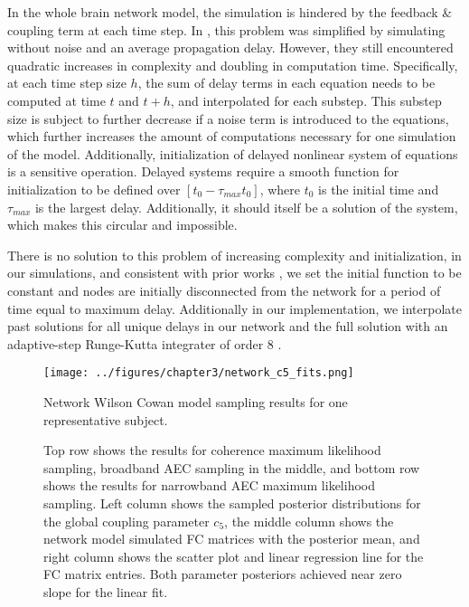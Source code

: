 In the whole brain network model, the simulation is hindered by the feedback \& coupling term at each time step. In \cite{hadida_bayesian_2018}, this problem was simplified by simulating without noise and an average propagation delay. However, they still encountered quadratic increases in complexity and doubling in computation time. Specifically, at each time step size $h$, the sum of delay terms in each equation needs to be computed at time $t$ and $t+h$, and interpolated for each substep. This substep size is subject to further decrease if a noise term is introduced to the equations, which further increases the amount of computations necessary for one simulation of the model. Additionally, initialization of delayed nonlinear system of equations is a sensitive operation. Delayed systems require a smooth function for initialization to be defined over $[t_0 - \tau_{max} t_0]$, where $t_0$ is the initial time and $\tau_{max}$ is the largest delay. Additionally, it should itself be a solution of the system, which makes this circular and impossible. 

There is no solution to this problem of increasing complexity and initialization, in our simulations, and consistent with prior works \cite{hadida_bayesian_2018}, we set the initial function to be constant and nodes are initially disconnected from the network for a period of time equal to maximum delay. Additionally in our implementation, we interpolate past solutions for all unique delays in our network and the full solution with an adaptive-step Runge-Kutta integrater of order 8 \cite{hairer_analysis_2008}.


\begin{figure}[htbp]
    \centering
    \texttt{[image: ../figures/chapter3/network\_c5\_fits.png]}
    \caption{Network Wilson Cowan model sampling results for one representative subject.}
    \caption*{Top row shows the results for coherence maximum likelihood sampling, broadband AEC sampling in the middle, and bottom row shows the results for narrowband AEC maximum likelihood sampling. Left column shows the sampled posterior distributions for the global coupling parameter $c_5$, the middle column shows the network model simulated FC matrices with the posterior mean, and right column shows the scatter plot and linear regression line for the FC matrix entries. Both parameter posteriors achieved near zero slope for the linear fit.}
    \label{fig:networkc5}
\end{figure}

